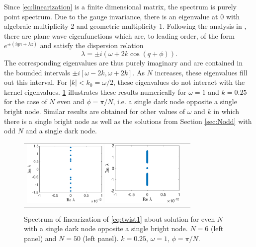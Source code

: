 \documentclass[reprint, amsmath,amssymb,aps]{revtex4-2}
\begin{document}
Since \cref{eq:linearization} is a finite dimensional matrix, the spectrum is purely point spectrum. Due to the gauge invariance, there is an eigenvalue at 0 with algebraic multiplicity 2 and geometric multiplicity 1. Following the analysis in \cite[Section 2.1.1.1]{Kevrekidis2009}, there are plane wave eigenfunctions which are, to leading order, of the form $e^{\pm( i q n + \lambda z)}$ and satisfy the dispersion relation
\begin{equation}\label{eq:dispersion}
\lambda = \pm i \left( \omega + 2 k \cos(q + \phi) \right).
\end{equation}
The corresponding eigenvalues are thus purely imaginary and are contained in the bounded intervals $\pm i[\omega - 2 k, \omega + 2 k]$. As $N$ increases, these eigenvalues fill out this interval. For $|k| < k_0 = \omega/2$, these eigenvalues do not interact with the kernel eigenvalues. \cref{fig:evenholespec} illustrates these results numerically for $\omega = 1$ and $k = 0.25$ for the case of $N$ even and $\phi = \pi/N$, i.e. a single dark node opposite a single bright node. Similar results are obtained for other values of $\omega$ and $k$ in which there is a single bright node as well as the solutions from Section \ref{sec:Nodd} with odd $N$ and a single dark node.
\begin{figure}
\begin{center}
\begin{tabular}{cc}
\includegraphics[width=4cm]{images/evenhole6spec.eps}
\includegraphics[width=4cm]{images/evenhole50spec.eps}
\end{tabular}
\end{center}
\caption{Spectrum of linearization of \cref{eq:twist1} about solution for even $N$ with a single dark node opposite a single bright node. $N=6$ (left panel) and $N=50$ (left panel). $k=0.25$, $\omega = 1$, $\phi = \pi/N$.}
\label{fig:evenholespec}
\end{figure}
\end{document}
